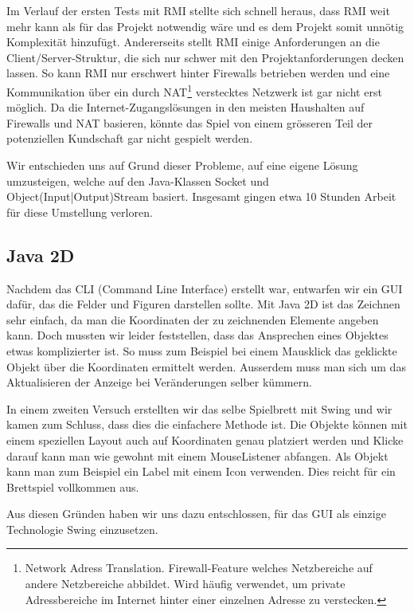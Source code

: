 \documentclass[a4paper,12pt,halfparskip,DIV14]{scrartcl}
\begin{document}
Im Verlauf der ersten Tests mit RMI stellte sich schnell heraus, dass RMI weit mehr kann als für das Projekt notwendig wäre und es dem Projekt somit unnötig Komplexität hinzufügt. Andererseits stellt RMI  einige Anforderungen an die Client/Server-Struktur, die sich nur schwer mit den Projektanforderungen decken lassen. So kann RMI nur erschwert hinter Firewalls betrieben werden und eine Kommunikation über ein durch NAT\footnote{Network Adress Translation. Firewall-Feature welches Netzbereiche auf andere Netzbereiche abbildet. Wird häufig verwendet, um private Adressbereiche im Internet hinter einer einzelnen Adresse zu verstecken.} verstecktes Netzwerk ist gar nicht erst möglich. Da die Internet-Zugangslösungen in den meisten Haushalten auf Firewalls und NAT basieren, könnte das Spiel von einem grösseren Teil der potenziellen Kundschaft gar nicht gespielt werden.

Wir entschieden uns auf Grund dieser Probleme, auf eine eigene Lösung umzusteigen, welche auf den Java-Klassen Socket und Object(Input|Output)Stream basiert. Insgesamt gingen etwa 10 Stunden Arbeit für diese Umstellung verloren.

\subsection{Java 2D} %
\label{java_2d}

Nachdem das CLI (Command Line Interface) erstellt war, entwarfen wir ein GUI dafür, das die Felder und Figuren darstellen sollte. Mit Java 2D ist das Zeichnen sehr einfach, da man die Koordinaten der zu zeichnenden Elemente angeben kann. Doch mussten wir leider feststellen, dass das Ansprechen eines Objektes etwas komplizierter ist. So muss zum Beispiel bei einem Mausklick das geklickte Objekt über die Koordinaten ermittelt werden. Ausserdem muss man sich um das Aktualisieren der Anzeige bei Veränderungen selber kümmern.

In einem zweiten Versuch erstellten wir das selbe Spielbrett mit Swing und wir kamen zum Schluss, dass dies die einfachere Methode ist. Die Objekte können mit einem speziellen Layout auch auf Koordinaten genau platziert werden und Klicke darauf kann man wie gewohnt mit einem MouseListener abfangen. Als Objekt kann man zum Beispiel ein Label mit einem Icon verwenden. Dies reicht für ein Brettspiel vollkommen aus.

Aus diesen Gründen haben wir uns dazu entschlossen, für das GUI als einzige Technologie Swing einzusetzen.


\end{document}
